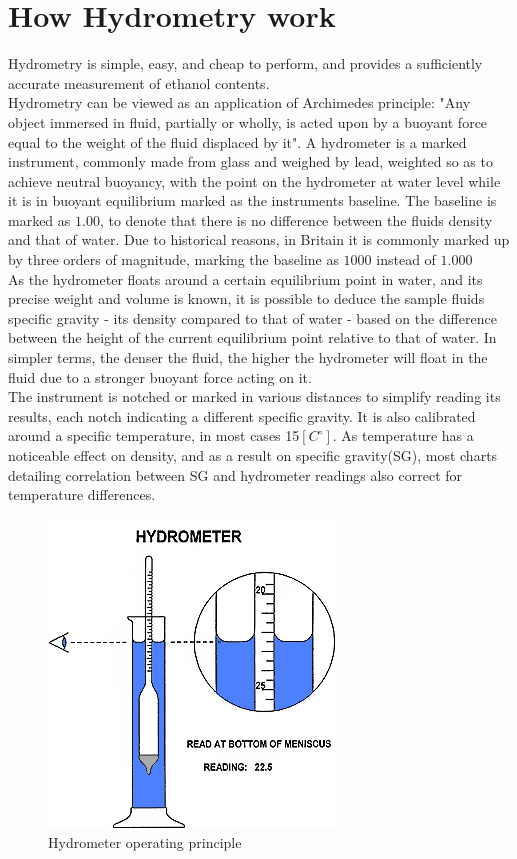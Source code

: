 \documentclass[twoside]{ctuthesis}
\theoremstyle{plain}
\theoremstyle{definition}
\theoremstyle{note}
\begin{document}
\section{How Hydrometry work}
Hydrometry is simple, easy, and cheap to perform, and provides a sufficiently accurate measurement of ethanol contents.\\
Hydrometry can be viewed as an application of Archimedes principle: "Any object immersed in fluid, partially or wholly, is acted upon by a buoyant force equal to the weight of the fluid displaced by it". A hydrometer is a marked instrument, commonly made from glass and weighed by lead\cite{Ethanol_Measurement}, weighted so as to achieve neutral buoyancy, with the point on the hydrometer at water level while it is in buoyant equilibrium marked as the instruments baseline. The baseline is marked as $1.00$, to denote that there is no difference between the fluids density and that of water. Due to historical reasons, in Britain it is commonly marked up by three orders of magnitude, marking the baseline as $1000$\cite{Brewing_Science} instead of $1.000$\\
As the hydrometer floats around a certain equilibrium point in water, and its precise weight and volume is known, it is possible to deduce the sample fluids specific gravity - its density compared to that of water - based on the difference between the height of the current equilibrium point relative to that of water. In simpler terms, the denser the fluid, the higher the hydrometer will float in the fluid due to a stronger buoyant force acting on it.\\
The instrument is notched or marked in various distances to simplify reading its results, each notch indicating a different specific gravity. It is also calibrated around a specific temperature, in most cases 15$[C^{\circ}]$\cite{Ethanol_Measurement}. As temperature has a noticeable effect on density, and as a result on specific gravity(SG), most charts detailing correlation between SG and hydrometer readings also correct for temperature differences.\\


\begin{figure}[H]
	\centering
	\includegraphics[scale=0.7]{hydrometer}
	\caption{Hydrometer operating principle \cite{Hydrometer_Pic}}
\end{figure}
\end{document}
